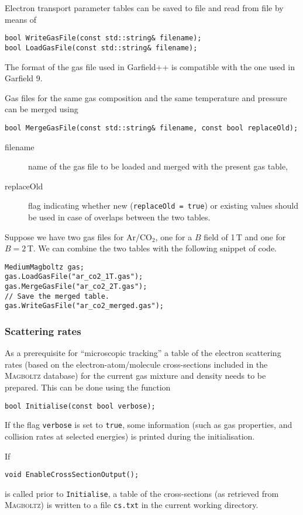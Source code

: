 Electron transport parameter tables can be saved to file 
and read from file by means of
\begin{lstlisting}
bool WriteGasFile(const std::string& filename);
bool LoadGasFile(const std::string& filename);
\end{lstlisting}

The format of the gas file used in Garfield++ is compatible with the 
one used in Garfield 9. 

Gas files for the same gas composition and the same temperature and pressure
can be merged using
\begin{lstlisting}
bool MergeGasFile(const std::string& filename, const bool replaceOld);
\end{lstlisting}
\begin{description}
  \item[filename] name of the gas file to be loaded and merged with the 
present gas table,
  \item[replaceOld] flag indicating whether new (\texttt{replaceOld = true}) or existing values should be used in case of overlaps between the 
two tables. 
\end{description}
Suppose we have two gas files for Ar/CO$_{2}$, one for a $B$ field of 1\,T
and one for $B = 2$\,T. We can combine the two tables 
with the following snippet of code.
\begin{lstlisting}
MediumMagboltz gas;
gas.LoadGasFile("ar_co2_1T.gas");
gas.MergeGasFile("ar_co2_2T.gas");
// Save the merged table.
gas.WriteGasFile("ar_co2_merged.gas");
\end{lstlisting} 

\subsubsection{Scattering rates}

As a prerequisite for ``microscopic tracking'' a 
table of the electron scattering rates 
(based on the electron-atom/molecule cross-sections included in the 
\textsc{Magboltz} database) for the 
current gas mixture and density needs to be prepared. 
This can be done using the function 
\begin{lstlisting}
bool Initialise(const bool verbose);
\end{lstlisting}
If the flag \texttt{verbose} is set to \texttt{true}, 
some information (such as gas properties, and collision rates at selected 
energies) is printed during the initialisation.  

If 
\begin{lstlisting}
void EnableCrossSectionOutput();
\end{lstlisting}
is called prior to \texttt{Initialise}, a table of the cross-sections 
(as retrieved from \textsc{Magboltz}) is written to a file \texttt{cs.txt} 
in the current working directory. 

